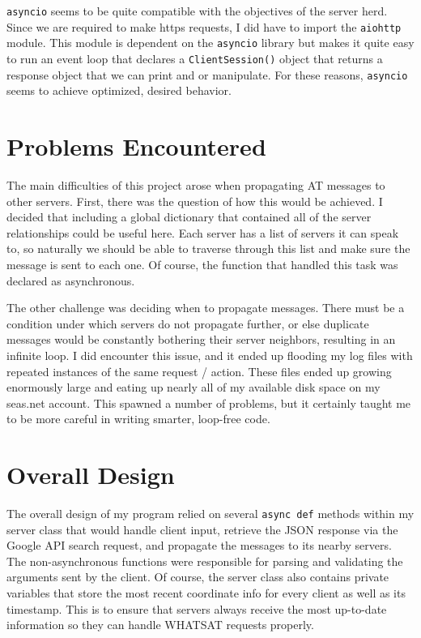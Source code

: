 \verb +asyncio+ seems to be quite compatible with the objectives of the server herd. Since we are required to make https requests, I did have to import the \verb +aiohttp+ module. This module is dependent on the \verb +asyncio+ library but makes it quite easy to run an event loop that declares a \verb +ClientSession()+ object that returns a response object that we can print and or manipulate. For these reasons,  \verb +asyncio+ seems to achieve optimized, desired behavior.

\section{Problems Encountered}
The main difficulties of this project arose when propagating AT messages to other servers. First, there was the question of how this would be achieved. I decided that including a global dictionary that contained all of the server relationships could be useful here. Each server has a list of servers it can speak to, so naturally we should be able to traverse through this list and make sure the message is sent to each one. Of course, the function that handled this task was declared as asynchronous. 

The other challenge was deciding when to propagate messages. There must be a condition under which servers do not propagate further, or else duplicate messages would be constantly bothering their server neighbors, resulting in an infinite loop. I did encounter this issue, and it ended up flooding my log files with repeated instances of the same request / action. These files ended up growing enormously large and eating up nearly all of my available disk space on my seas.net account. This spawned a number of problems, but it certainly taught me to be more careful in writing smarter, loop-free code. 

\section{Overall Design}
The overall design of my program relied on several \verb +async def+ methods within my server class that would handle client input, retrieve the JSON response via the Google API search request, and propagate the messages to its nearby servers. The non-asynchronous functions were responsible for parsing and validating the arguments sent by the client. Of course, the server class also contains private variables that store the most recent coordinate info for every client as well as its timestamp. This is to ensure that servers always receive the most up-to-date information so they can handle WHATSAT requests properly. 

